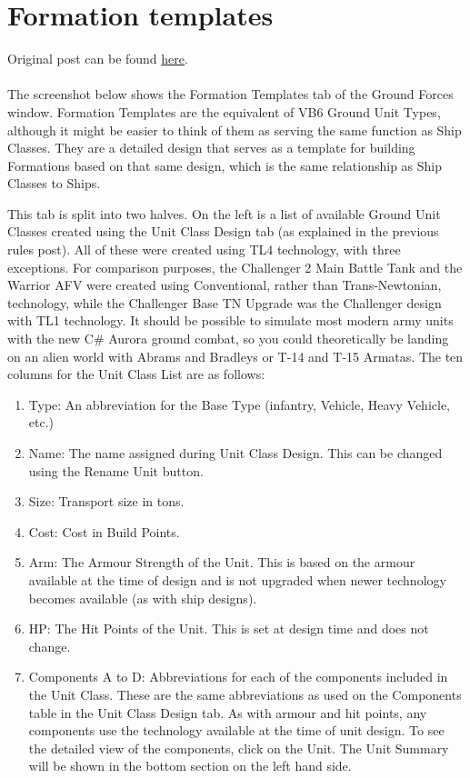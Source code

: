 \documentclass[../../Aurora C# unofficial manual.tex]{subfiles}
\begin{document}
	\section{Formation templates}
	Original post can be found
	\href{http://aurora2.pentarch.org/index.php?topic=8495.msg105832#msg105832}{here}.
	\\\\
	
	The screenshot below shows the Formation Templates tab of the Ground Forces window. Formation Templates are the equivalent of VB6 Ground Unit Types, although it might be easier to think of them as serving the same function as Ship Classes. They are a detailed design that serves as a template for building Formations based on that same design, which is the same relationship as Ship Classes to Ships.
	
	This tab is split into two halves. On the left is a list of available Ground Unit Classes created using the Unit Class Design tab (as explained in the previous rules post). All of these were created using TL4 technology, with three exceptions. For comparison purposes, the Challenger 2 Main Battle Tank and the Warrior AFV were created using Conventional, rather than Trans-Newtonian, technology, while the Challenger Base TN Upgrade was the Challenger design with TL1 technology. It should be possible to simulate most modern army units with the new C\# Aurora ground combat, so you could theoretically be landing on an alien world with Abrams and Bradleys or T-14 and T-15 Armatas. The ten columns for the Unit Class List are as follows:
	\begin{enumerate}
		\item Type: An abbreviation for the Base Type (infantry, Vehicle, Heavy Vehicle, etc.)
		\item Name: The name assigned during Unit Class Design. This can be changed using the Rename Unit button.
		\item Size: Transport size in tons.
		\item Cost: Cost in Build Points.
		\item Arm: The Armour Strength of the Unit. This is based on the armour available at the time of design and is not upgraded when newer technology becomes available (as with ship designs).
		\item HP: The Hit Points of the Unit. This is set at design time and does not change.
		\item Components A to D: Abbreviations for each of the components included in the Unit Class. These are the same abbreviations as used on the Components table in the Unit Class Design tab. As with armour and hit points, any components use the technology available at the time of unit design. To see the detailed view of the components, click on the Unit. The Unit Summary will be shown in the bottom section on the left hand side.
	\end{enumerate} 
	
\end{document}
